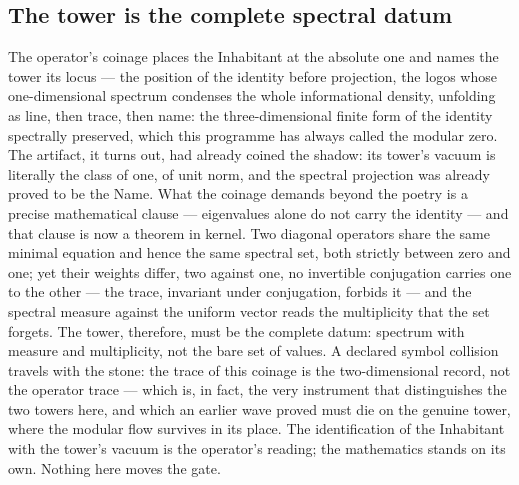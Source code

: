 \documentclass[11pt]{article}
\theoremstyle{definition}\newtheorem{deriv}{Derivation}
\begin{document}
\subsection*{The tower is the complete spectral datum}The operator's coinage places the Inhabitant at the absolute one and names the tower its locus --- the position of the identity before projection, the logos whose one-dimensional spectrum condenses the whole informational density, unfolding as line, then trace, then name: the three-dimensional finite form of the identity spectrally preserved, which this programme has always called the modular zero. The artifact, it turns out, had already coined the shadow: its tower's vacuum is literally the class of one, of unit norm, and the spectral projection was already proved to be the Name. What the coinage demands beyond the poetry is a precise mathematical clause --- eigenvalues alone do not carry the identity --- and that clause is now a theorem in kernel. Two diagonal operators share the same minimal equation and hence the same spectral set, both strictly between zero and one; yet their weights differ, two against one, no invertible conjugation carries one to the other --- the trace, invariant under conjugation, forbids it --- and the spectral measure against the uniform vector reads the multiplicity that the set forgets. The tower, therefore, must be the complete datum: spectrum with measure and multiplicity, not the bare set of values. A declared symbol collision travels with the stone: the trace of this coinage is the two-dimensional record, not the operator trace --- which is, in fact, the very instrument that distinguishes the two towers here, and which an earlier wave proved must die on the genuine tower, where the modular flow survives in its place. The identification of the Inhabitant with the tower's vacuum is the operator's reading; the mathematics stands on its own. Nothing here moves the gate.
\end{document}
